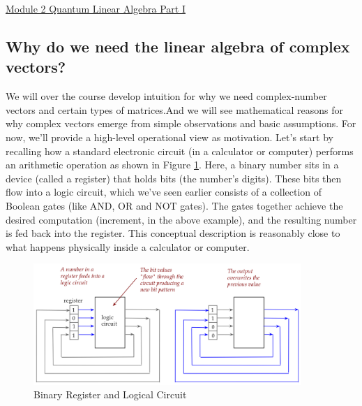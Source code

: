 \documentclass[main.tex]{subfiles}
\begin{document}
\href{https://www2.seas.gwu.edu/~simhaweb/quantum/modules/module2/module2.html}{Module 2 Quantum Linear Algebra Part I}

\subsection{Why do we need the linear algebra of complex vectors?}

    We will over the course develop intuition for why we need complex-number vectors and certain types of matrices.And we will see mathematical reasons for why complex vectors emerge from simple observations and basic assumptions. For now, we'll provide a high-level operational view as motivation. Let's start by recalling how a standard electronic circuit (in a calculator or computer) performs an arithmetic operation as shown in Figure \ref{fig:01addition}. Here, a binary number sits in a device (called a register) that holds bits (the number's digits). These bits then flow into a logic circuit, which we've seen earlier consists of a collection of Boolean gates (like AND, OR and NOT gates). The gates together achieve the desired computation (increment, in the above example), and the resulting number is fed back into the register. This conceptual description is reasonably close to what happens physically inside a calculator or computer.

    \begin{figure}
        \centering
        \includegraphics[width=4in]{notes/figs/n04/01circuit.png}
        \caption{Binary Register and Logical Circuit}
        \label{fig:01addition}
    \end{figure}
    
\end{document}
